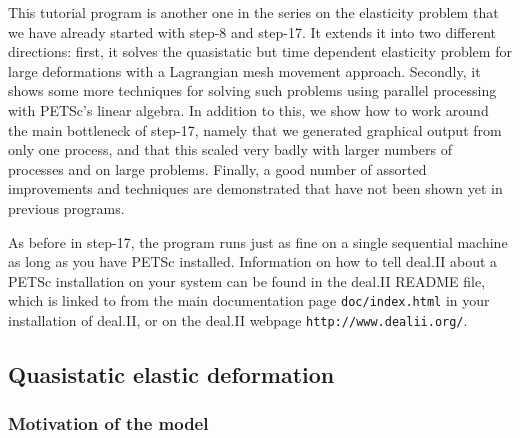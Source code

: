 \documentclass{article}
\begin{document}
This tutorial program is another one in the series on the elasticity problem
that we have already started with step-8 and step-17. It extends it into two
different directions: first, it solves the quasistatic but time dependent
elasticity problem for large deformations with a Lagrangian mesh movement
approach. Secondly, it shows some more techniques for solving such problems
using parallel processing with PETSc's linear algebra. In addition to this, we
show how to work around the main bottleneck of step-17, namely that we
generated graphical output from only one process, and that this scaled very
badly with larger numbers of processes and on large problems. Finally, a good
number of assorted improvements and techniques are demonstrated that have not
been shown yet in previous programs.

As before in step-17, the program runs just as fine on a single sequential
machine as long as you have PETSc installed. Information on how to tell
deal.II about a PETSc installation on your system can be found in the deal.II
README file, which is linked to from the main documentation page
\texttt{doc/index.html} in your installation of deal.II, or on the deal.II
webpage \texttt{http://www.dealii.org/}.


\subsection*{Quasistatic elastic deformation}

\subsubsection*{Motivation of the model}
\end{document}
